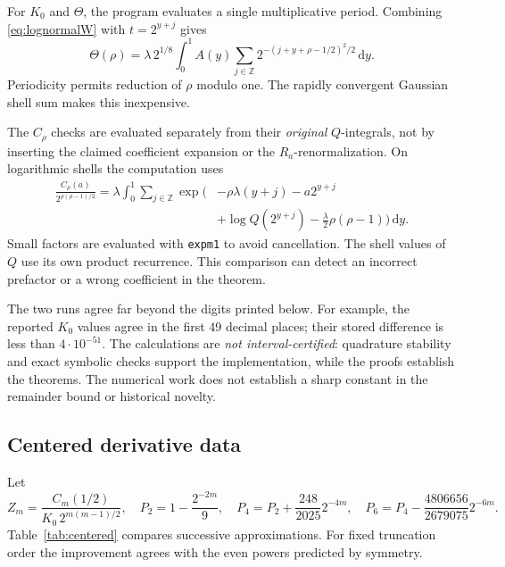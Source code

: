 \documentclass[11pt,letterpaper]{article}
\numberwithin{equation}{section}
\theoremstyle{definition}
\theoremstyle{remark}
\newcommand{\Z}{\mathbb Z}
\newcommand{\dd}{\,\mathrm d}
\begin{document}
For $K_0$ and $\Theta$, the program evaluates a single multiplicative
period. Combining \eqref{eq:lognormalW} with $t=2^{y+j}$ gives
\begin{equation}\label{eq:onecellTheta}
 \Theta(\rho)=\lambda\,2^{1/8}
 \int_0^1 A(y)\sum_{j\in\Z}
 2^{-(j+y+\rho-1/2)^2/2}\dd y.
\end{equation}
Periodicity permits reduction of $\rho$ modulo one.
The rapidly convergent Gaussian shell sum makes this inexpensive.

The $C_\rho$ checks are evaluated separately from their \emph{original}
$Q$-integrals, not by inserting the claimed coefficient expansion or the
$R_a$-renormalization. On logarithmic shells the computation uses
\begin{equation}\label{eq:onecellC}
 \begin{split}
 \frac{C_\rho(a)}{2^{\rho(\rho-1)/2}}
  =\lambda\int_0^1\sum_{j\in\Z}
  \exp\bigl(&-\rho\lambda(y+j)-a2^{y+j}\\
       &+\log Q(2^{y+j})-\tfrac\lambda2\rho(\rho-1)\bigr)\dd y.
 \end{split}
\end{equation}
Small factors are evaluated with \texttt{expm1} to avoid cancellation.
The shell values of $Q$ use its own product recurrence. This comparison
can detect an incorrect prefactor or a wrong coefficient in the theorem.

The two runs agree far beyond the digits printed below. For example,
the reported $K_0$ values agree in the first 49 decimal places; their
stored difference is less than $4\cdot10^{-51}$.
The calculations are \emph{not interval-certified}: quadrature stability
and exact symbolic checks support the implementation, while the proofs
establish the theorems. The numerical work does not establish a sharp
constant in the remainder bound or historical novelty.

\subsection{Centered derivative data}
Let
\[
 Z_m=\frac{C_m(1/2)}{K_0\,2^{m(m-1)/2}},\quad
 P_2=1-\frac{2^{-2m}}9,\quad
 P_4=P_2+\frac{248}{2025}2^{-4m},\quad
 P_6=P_4-\frac{4806656}{2679075}2^{-6m}.
\]
Table~\ref{tab:centered} compares successive approximations. For fixed
truncation order the improvement agrees with the even powers predicted by
symmetry.
\end{document}
